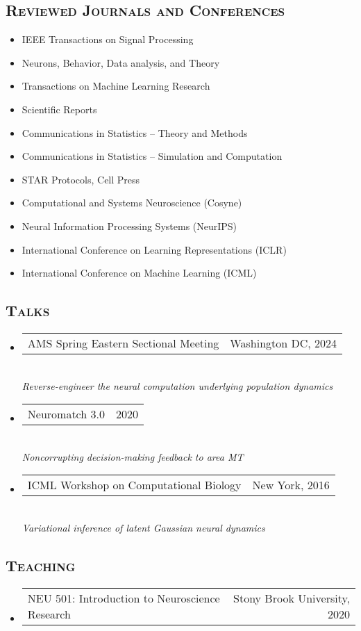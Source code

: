\documentclass[11pt]{article}
\makeatletter
\newcommand{\headerrow}[2]
{\begin{tabular*}{\linewidth}{l@{\extracolsep{\fill}}r}
	#1 &
	#2 \\
\end{tabular*}}
\makeatother
\begin{document}
\subsection*{\textsc{Reviewed Journals and Conferences}}
\begin{itemize}
    \item IEEE Transactions on Signal Processing
    \item Neurons, Behavior, Data analysis, and Theory
    \item Transactions on Machine Learning Research
    \item Scientific Reports
    \item Communications in Statistics – Theory and Methods
    \item Communications in Statistics – Simulation and Computation
    \item STAR Protocols, Cell Press
    \\
    \item Computational and Systems Neuroscience (Cosyne) 
    \item Neural Information Processing Systems (NeurIPS) 
    \item International Conference on Learning Representations (ICLR)
    \item International Conference on Machine Learning (ICML)
\end{itemize}

\subsection*{\textsc{Talks}}
\begin{itemize}
    \item \headerrow{AMS Spring Eastern Sectional Meeting}{Washington DC, 2024} \\
    \textit{Reverse-engineer the neural computation underlying population dynamics}
    \item \headerrow{Neuromatch 3.0}{2020} \\
    \textit{Noncorrupting decision-making feedback to area MT}
    \item \headerrow{ICML Workshop on Computational Biology}{New York, 2016} \\
    \textit{Variational inference of latent Gaussian neural dynamics} 
\end{itemize}

\subsection*{\textsc{Teaching}}
\begin{itemize}
    \item
    \headerrow{NEU 501: \small Introduction to Neuroscience Research}{Stony Brook University, 2020}
\end{itemize}
\end{document}
